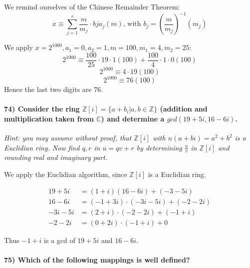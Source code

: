 \documentclass[
]{article}
\begin{document}
We remind ourselves of the Chinese Remainder Theorem: \[
x \equiv \sum_{j=1}^{r} \frac{m}{m_j} \cdot bj a_j (m) \text{, with } b_j = (\frac{m}{m_j})^{-1} (m_j)
\]

We apply \(x = 2^{1000}, a_1 = 0, a_2 = 1, m = 100, m_1 = 4, m_2 = 25\):
\[
2^{1000} \equiv \frac{100}{25} \cdot 19 \cdot 1 (100) + \frac{100}{4} \cdot 1 \cdot 0 (100)
\] \[
2^{1000} \equiv 4 \cdot 19 (100) 
\] \[
2^{1000} \equiv 76 (100) 
\] Hence the last two digits are \(76\).

\hypertarget{consider-the-ring-mathbbzi-a-b_i-ab-in-mathbbz-addition-and-multiplication-taken-from-mathbbc-and-determine-a-gcd19-5i-16-6i.}{%
\paragraph{\texorpdfstring{74) Consider the ring
\(\mathbb{Z}[i] = \{a + b_i | a,b \in \mathbb{Z} \}\) (addition and
multiplication taken from \(\mathbb{C}\)) and determine a
\(gcd(19 + 5i, 16-6i)\).}{74) Consider the ring \textbackslash mathbb\{Z\}{[}i{]} = \textbackslash\{a + b\_i \textbar{} a,b \textbackslash in \textbackslash mathbb\{Z\} \textbackslash\} (addition and multiplication taken from \textbackslash mathbb\{C\}) and determine a gcd(19 + 5i, 16-6i).}}\label{consider-the-ring-mathbbzi-a-b_i-ab-in-mathbbz-addition-and-multiplication-taken-from-mathbbc-and-determine-a-gcd19-5i-16-6i.}}

\emph{Hint: you may assume without proof, that \(\mathbb{Z}[i]\) with
\(n(a+bi) = a^2 + b^2\) is a Euclidian ring. Now find \(q,r\) in
\(u = qv + r\) by determining \(\frac{u}{v}\) in \(\mathbb{Z}[i]\) and
rounding real and imaginary part.}

We apply the Euclidian algorithm, since \(\mathbb{Z}[i]\) is a Euclidian
ring.

\[
\begin{aligned}
19 + 5i &= (1+i) (16 -6i) + (-3-5i)\\
16 - 6i &= (-1 + 3i) \cdot (-3i -5i) + (-2-2i)\\
-3i - 5i &= (2+i) \cdot (-2-2i) + (-1+i)\\
-2-2i &= (0 + 2i) \cdot (-1 + i) + 0
\end{aligned}
\]

Thus \(-1+i\) is a gcd of \(19+5i\) and \(16-6i\).

\hypertarget{which-of-the-following-mappings-is-well-defined}{%
\paragraph{75) Which of the following mappings is well
defined?}\label{which-of-the-following-mappings-is-well-defined}}
\end{document}
